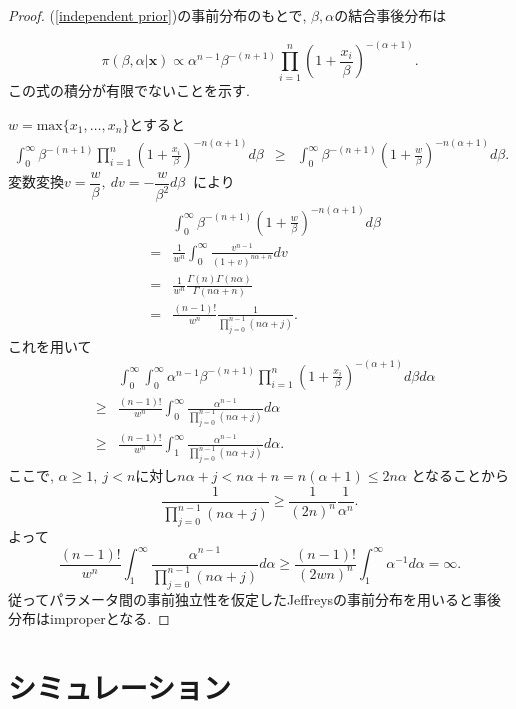 \documentclass[titlepage,twoside]{jarticle}
\theoremstyle{definition}
\begin{document}
\begin{proof}
(\ref{independent prior})の事前分布のもとで, $\beta ,\alpha $の結合事後分布は

$$
\pi(\beta ,\alpha |\bm{x})
\propto
\alpha^{n-1}\beta ^{-(n+1)}
\prod_{i=1}^{n}
\left(1+\frac{x_{i}}{\beta }
\right)^{-(\alpha +1)}.
$$
この式の積分が有限でないことを示す.

$w=\mbox{max}\{x_1,\ldots,x_n\}$とすると
\begin{eqnarray*}
\int_0^\infty \beta ^{-(n+1)}\prod_{i=1}^n
\left(1+\frac{x_i}{\beta }\right)^{-n(\alpha +1)}d\beta
&\geq&
\int_0^\infty \beta ^{-(n+1)}
\left(1+\frac{w}{\beta }\right)^{-n(\alpha +1)}d\beta.
\end{eqnarray*}
変数変換$v=\dfrac{w}{\beta },~dv=-\dfrac{w}{\beta ^{2}}d\beta ~$
により
\begin{eqnarray*}
&&
\int_{0}^{\infty}\beta ^{-(n+1)}
\left(1+\frac{w}{\beta }\right)^{-n(\alpha +1)}d\beta \\
&=&
\frac{1}{w^{n}}\int_{0}^{\infty}\frac{v^{n-1}}{(1+v)^{n\alpha +n}}dv \\
&=&
\frac{1}{w^{n}}\frac{\Gamma (n)\Gamma(n\alpha )}{\Gamma (n\alpha +n)} \\
&=&
\frac{(n-1)!}{w^{n}}\frac{1}{\prod_{j=0}^{n-1}(n\alpha +j)}.
\end{eqnarray*}
これを用いて
\begin{eqnarray*}
&&
\int_0^\infty \int_0^\infty \alpha^{n-1}\beta ^{-(n+1)}
\prod_{i=1}^n\left(1+\frac{x_i}{\beta }\right)^{-(\alpha +1)}d\beta d\alpha \\
&\geq&
\frac{(n-1)!}{w^n}\int_0^\infty
\frac{\alpha ^{n-1}}{\prod_{j=0}^{n-1}(n\alpha +j)}d\alpha \\
&\geq&
\frac{(n-1)!}{w^n}\int_1^\infty
\frac{\alpha ^{n-1}}{\prod_{j=0}^{n-1}(n\alpha +j)}d\alpha .
\end{eqnarray*}
ここで, $\alpha \geq 1,~j<n$に対し$n\alpha +j < n\alpha +n 
= n(\alpha +1)\leq 2n\alpha $
となることから
$$
\frac{1}{\prod_{j=0}^{n-1}(n\alpha +j)}
\geq
\frac{1}{(2n)^n}\frac{1}{\alpha ^n} .
$$
よって
$$
\frac{(n-1)!}{w^n}\int_1^\infty 
\frac{\alpha ^{n-1}}{\prod_{j=0}^{n-1}(n\alpha +j)}d\alpha
\geq
\frac{(n-1)!}{(2wn)^n}\int_1^\infty \alpha ^{-1}d\alpha
=\infty.
$$
従ってパラメータ間の事前独立性を仮定したJeffreysの事前分布を用いると事後分布はimproperとなる.
\end{proof}


\section{シミュレーション}\label{sec_analysis}
\end{document}
